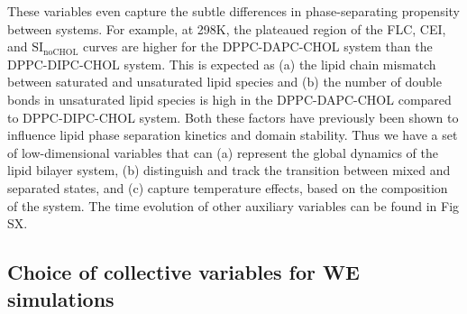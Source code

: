 \documentclass{biophys-new}
\begin{document}
These variables even capture the subtle differences in phase-separating propensity between systems.
For example, at 298K, the plateaued region of the FLC, CEI, and $\text{SI}_{\text{noCHOL}}$ curves are higher for the DPPC-DAPC-CHOL system than the DPPC-DIPC-CHOL system.
This is expected as (a) the lipid chain mismatch between saturated and unsaturated lipid species and (b) the number of double bonds in unsaturated lipid species is high in the DPPC-DAPC-CHOL compared to DPPC-DIPC-CHOL system.
Both these factors have previously been shown to influence lipid phase separation kinetics and domain stability\cite{Fowler2016, Lin2016}.
Thus we have a set of low-dimensional variables that can (a) represent the global dynamics of the lipid bilayer system,
(b) distinguish and track the transition between mixed and separated states, and (c) capture temperature effects,
based on the composition of the system.
The time evolution of other auxiliary variables can be found in Fig SX.

\subsection*{Choice of collective variables for WE simulations}
\end{document}

